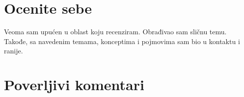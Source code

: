 \documentclass[a4paper]{article}
\begin{document}
\section{Ocenite sebe}
Veoma sam upućen u oblast koju recenziram. Obrađivao sam sličnu temu. Takođe, sa navedenim temama, konceptima i pojmovima sam bio u kontaktu i ranije.


\section{Poverljivi komentari}
\end{document}
